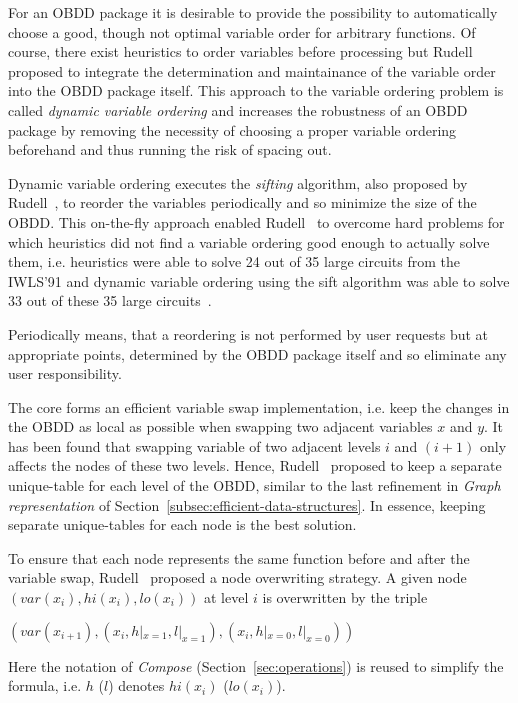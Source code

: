 \documentclass{vldb}
\begin{document}
For an OBDD package it is desirable to provide the possibility to automatically 
choose a good, though not optimal variable order for arbitrary functions. Of
course, there exist heuristics to order variables before processing but
Rudell~\cite{RUDELL93} proposed to integrate the determination and maintainance
of the variable order into the OBDD package itself. This approach to the variable
ordering problem is called \textit{dynamic variable ordering} and increases the
robustness of an OBDD package by removing the necessity of choosing a proper
variable ordering beforehand and thus running the risk of spacing out.

Dynamic variable ordering executes the \textit{sifting} algorithm, also proposed
by Rudell~\cite{RUDELL93}, to reorder the variables periodically and so minimize
the size of the OBDD. This on-the-fly approach enabled Rudell~\cite{RUDELL93} to
overcome hard problems for which heuristics did not find a variable ordering good
enough to actually solve them, i.e. heuristics were able to solve 24 out of 35
large circuits from the IWLS'91 and dynamic variable ordering using the sift
algorithm was able to solve 33 out of these 35 large circuits~\cite{RUDELL93}.

Periodically means, that a reordering is not performed by user requests but at
appropriate points, determined by the OBDD package itself and so eliminate any
user responsibility.

The core forms an efficient variable swap implementation, i.e. keep the changes
in the OBDD as local as possible when swapping two adjacent variables $x$ and
$y$. It has been found that swapping variable of two adjacent levels $i$ and
$(i+1)$ only affects the nodes of these two levels. Hence, Rudell~\cite{RUDELL93}
proposed to keep a separate unique-table for each level of the OBDD, similar to
the last refinement in \textit{Graph representation} of
Section~\ref{subsec:efficient-data-structures}. In essence, keeping separate 
unique-tables for each node is the best solution.

To ensure that each node represents the same function before and after the variable
swap, Rudell~\cite{RUDELL93} proposed a node overwriting strategy. A given node
$(var(x_i), hi(x_i), lo(x_i))$ at level $i$ is overwritten by the triple
\begin{center}
$(var(x_{i+1}), (x_i, h|_{x=1}, l|_{x=1}), (x_i, h|_{x=0}, l|_{x=0}))$
\end{center}
Here the notation of \textit{Compose} (Section~\ref{sec:operations}) is reused
to simplify the formula, i.e. $h$ ($l$) denotes $hi(x_i)$ ($lo(x_i)$).
\end{document}
